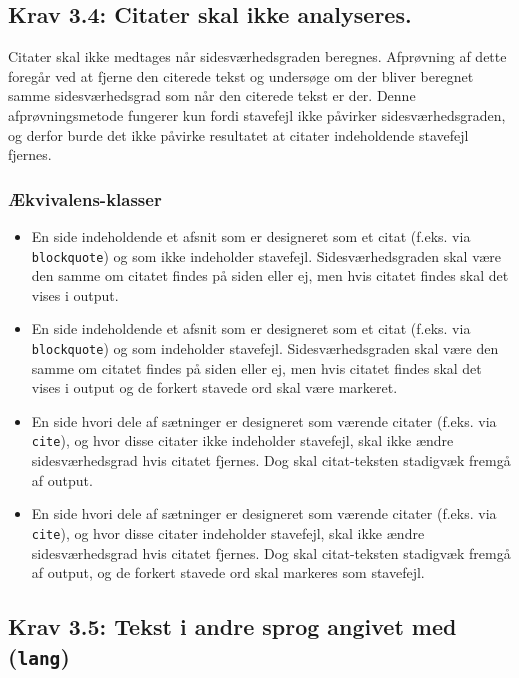 \documentclass[a4paper,oneside,article]{memoir}
\begin{document}
\subsection{Krav 3.4: Citater skal ikke analyseres.}

Citater skal ikke medtages når sidesværhedsgraden beregnes. Afprøvning
af dette foregår ved at fjerne den citerede tekst og undersøge om der
bliver beregnet samme sidesværhedsgrad som når den citerede tekst er
der. Denne afprøvningsmetode fungerer kun fordi stavefejl ikke
påvirker sidesværhedsgraden, og derfor burde det ikke påvirke
resultatet at citater indeholdende stavefejl fjernes.

\subsubsection{Ækvivalens-klasser}
\begin{itemize}
\item En side indeholdende et afsnit som er designeret som et citat
  (f.eks. via \texttt{blockquote}) og som ikke indeholder
  stavefejl. Sidesværhedsgraden skal være den samme om citatet findes
  på siden eller ej, men hvis citatet findes skal det vises i output.
\item En side indeholdende et afsnit som er designeret som et citat
  (f.eks. via \texttt{blockquote}) og som indeholder
  stavefejl. Sidesværhedsgraden skal være den samme om citatet findes
  på siden eller ej, men hvis citatet findes skal det vises i output
  og de forkert stavede ord skal være markeret.
\item En side hvori dele af sætninger er designeret som værende
  citater (f.eks. via \texttt{cite}), og hvor disse citater ikke
  indeholder stavefejl, skal ikke ændre sidesværhedsgrad hvis citatet
  fjernes. Dog skal citat-teksten stadigvæk fremgå af output.
\item En side hvori dele af sætninger er designeret som værende
  citater (f.eks. via \texttt{cite}), og hvor disse citater indeholder
  stavefejl, skal ikke ændre sidesværhedsgrad hvis citatet
  fjernes. Dog skal citat-teksten stadigvæk fremgå af output, og de
  forkert stavede ord skal markeres som stavefejl.
\end{itemize}

\subsection{Krav 3.5: Tekst i andre sprog angivet med
  (\texttt{lang})}
\end{document}
